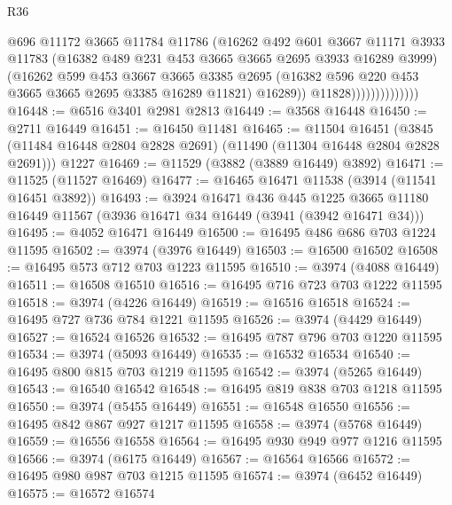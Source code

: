 \begin{lexlean}{R36}
\begin{coremodule}
                                @696
                                @11172
                                @3665
                                @11784
                                @11786
                                (@16262
                                  @492
                                  @601
                                  @3667
                                  @11171
                                  @3933
                                  @11783
                                  (@16382 @489 @231 @453 @3665 @3665 @2695 @3933 @16289 @3999)
                                  (@16262
                                    @599
                                    @453
                                    @3667
                                    @3665
                                    @3385
                                    @2695
                                    (@16382 @596 @220 @453 @3665 @3665 @2695 @3385 @16289 @11821)
                                    @16289))
                                @11828))))))))))))))
@16448 := @6516 @3401 @2981 @2813
@16449 := @3568 @16448
@16450 := @2711 @16449
@16451 := @16450 @11481
@16465 := @11504
    @16451
    (@3845 (@11484 @16448 @2804 @2828 @2691) (@11490 (@11304 @16448 @2804 @2828 @2691)))
    @1227
@16469 := @11529 (@3882 (@3889 @16449) @3892)
@16471 := @11525 (@11527 @16469)
@16477 := @16465 @16471 @11538 (@3914 (@11541 @16451 @3892))
@16493 := @3924
    @16471
    @436
    @445
    @1225
    @3665
    @11180
    @16449
    @11567
    (@3936 @16471 @34 @16449 (@3941 (@3942 @16471 @34)))
@16495 := @4052 @16471 @16449
@16500 := @16495 @486 @686 @703 @1224 @11595
@16502 := @3974 (@3976 @16449)
@16503 := @16500 @16502
@16508 := @16495 @573 @712 @703 @1223 @11595
@16510 := @3974 (@4088 @16449)
@16511 := @16508 @16510
@16516 := @16495 @716 @723 @703 @1222 @11595
@16518 := @3974 (@4226 @16449)
@16519 := @16516 @16518
@16524 := @16495 @727 @736 @784 @1221 @11595
@16526 := @3974 (@4429 @16449)
@16527 := @16524 @16526
@16532 := @16495 @787 @796 @703 @1220 @11595
@16534 := @3974 (@5093 @16449)
@16535 := @16532 @16534
@16540 := @16495 @800 @815 @703 @1219 @11595
@16542 := @3974 (@5265 @16449)
@16543 := @16540 @16542
@16548 := @16495 @819 @838 @703 @1218 @11595
@16550 := @3974 (@5455 @16449)
@16551 := @16548 @16550
@16556 := @16495 @842 @867 @927 @1217 @11595
@16558 := @3974 (@5768 @16449)
@16559 := @16556 @16558
@16564 := @16495 @930 @949 @977 @1216 @11595
@16566 := @3974 (@6175 @16449)
@16567 := @16564 @16566
@16572 := @16495 @980 @987 @703 @1215 @11595
@16574 := @3974 (@6452 @16449)
@16575 := @16572 @16574

\end{coremodule}
\end{lexlean}
